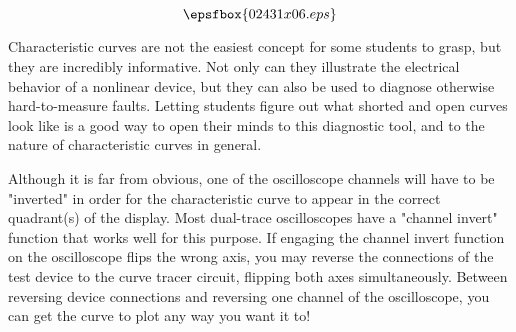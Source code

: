 
$$\epsfbox{02431x06.eps}$$







Characteristic curves are not the easiest concept for some students to grasp, but they are incredibly informative.  Not only can they illustrate the electrical behavior of a nonlinear device, but they can also be used to diagnose otherwise hard-to-measure faults.  Letting students figure out what shorted and open curves look like is a good way to open their minds to this diagnostic tool, and to the nature of characteristic curves in general.

Although it is far from obvious, one of the oscilloscope channels will have to be "inverted" in order for the characteristic curve to appear in the correct quadrant(s) of the display.  Most dual-trace oscilloscopes have a "channel invert" function that works well for this purpose.  If engaging the channel invert function on the oscilloscope flips the wrong axis, you may reverse the connections of the test device to the curve tracer circuit, flipping both axes simultaneously.  Between reversing device connections and reversing one channel of the oscilloscope, you can get the curve to plot any way you want it to!




